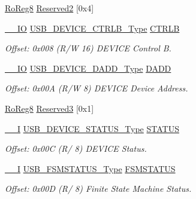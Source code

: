 \begin{DoxyCompactItemize}
\mbox{\hyperlink{group___s_a_m_d21_e15_a__definitions_ga0d957f1433aaf5d70e4dc2b68288442d}{Ro\+Reg8}} \mbox{\hyperlink{struct_usb_device_a78f3c89e13bd565a077e9418f43aaa04}{Reserved2}} \mbox{[}0x4\mbox{]}
\item 
\mbox{\hyperlink{core__cm0plus_8h_aec43007d9998a0a0e01faede4133d6be}{\+\_\+\+\_\+\+IO}} \mbox{\hyperlink{union_u_s_b___d_e_v_i_c_e___c_t_r_l_b___type}{U\+S\+B\+\_\+\+D\+E\+V\+I\+C\+E\+\_\+\+C\+T\+R\+L\+B\+\_\+\+Type}} \mbox{\hyperlink{struct_usb_device_a7d9e693fc058a456305b0e11e25af69b}{C\+T\+R\+LB}}
\begin{DoxyCompactList}\small\item\em Offset\+: 0x008 (R/W 16) D\+E\+V\+I\+CE Control B. \end{DoxyCompactList}\item 
\mbox{\hyperlink{core__cm0plus_8h_aec43007d9998a0a0e01faede4133d6be}{\+\_\+\+\_\+\+IO}} \mbox{\hyperlink{union_u_s_b___d_e_v_i_c_e___d_a_d_d___type}{U\+S\+B\+\_\+\+D\+E\+V\+I\+C\+E\+\_\+\+D\+A\+D\+D\+\_\+\+Type}} \mbox{\hyperlink{struct_usb_device_a7fb6fd524c4acb28f87678e680bb0cb8}{D\+A\+DD}}
\begin{DoxyCompactList}\small\item\em Offset\+: 0x00A (R/W 8) D\+E\+V\+I\+CE Device Address. \end{DoxyCompactList}\item 
\mbox{\hyperlink{group___s_a_m_d21_e15_a__definitions_ga0d957f1433aaf5d70e4dc2b68288442d}{Ro\+Reg8}} \mbox{\hyperlink{struct_usb_device_ae12c3e940f27988a085afebe2f779a21}{Reserved3}} \mbox{[}0x1\mbox{]}
\item 
\mbox{\hyperlink{core__cm0plus_8h_af63697ed9952cc71e1225efe205f6cd3}{\+\_\+\+\_\+I}} \mbox{\hyperlink{union_u_s_b___d_e_v_i_c_e___s_t_a_t_u_s___type}{U\+S\+B\+\_\+\+D\+E\+V\+I\+C\+E\+\_\+\+S\+T\+A\+T\+U\+S\+\_\+\+Type}} \mbox{\hyperlink{struct_usb_device_a97fe06199efe371e3f946da99598987f}{S\+T\+A\+T\+US}}
\begin{DoxyCompactList}\small\item\em Offset\+: 0x00C (R/ 8) D\+E\+V\+I\+CE Status. \end{DoxyCompactList}\item 
\mbox{\hyperlink{core__cm0plus_8h_af63697ed9952cc71e1225efe205f6cd3}{\+\_\+\+\_\+I}} \mbox{\hyperlink{union_u_s_b___f_s_m_s_t_a_t_u_s___type}{U\+S\+B\+\_\+\+F\+S\+M\+S\+T\+A\+T\+U\+S\+\_\+\+Type}} \mbox{\hyperlink{struct_usb_device_a96bd1d241ecd0cfafc7b234d2d76f769}{F\+S\+M\+S\+T\+A\+T\+US}}
\begin{DoxyCompactList}\small\item\em Offset\+: 0x00D (R/ 8) Finite State Machine Status. \end{DoxyCompactList}\item 

\end{DoxyCompactItemize}
